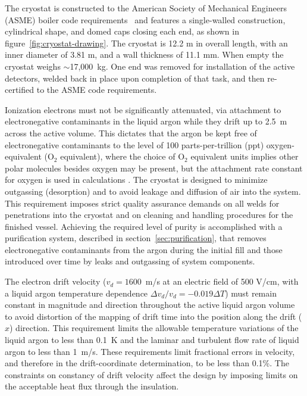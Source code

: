 The cryostat is constructed to the American Society of Mechanical Engineers (ASME) boiler code requirements~\cite{pressure:1316452} and features a single-walled construction, cylindrical shape, and domed caps closing each end, as shown in figure~\ref{fig:cryostat-drawing}. The cryostat is 12.2 m in overall length, with an inner diameter of 3.81 m, and a wall thickness of 11.1 mm.  When empty the cryostat weighs $\sim$17,000~kg.  One end was removed for installation of the active detectors, welded back in place upon completion of that task, and then re-certified to the ASME code requirements.  

Ionization electrons must not be significantly attenuated, via attachment to electronegative contaminants in the liquid argon while they drift up to 2.5~m across the active volume. This dictates that the argon be kept free of electronegative contaminants to the level of 100 parts-per-trillion (ppt) oxygen-equivalent (O$_2$ equivalent), where the choice of O$_2$ equivalent units implies other polar molecules besides oxygen may be present, but the attachment rate constant for oxygen is used in calculations . The cryostat is designed to minimize outgassing (desorption) and to avoid leakage and diffusion of air into the system. This requirement imposes strict quality assurance demands on all welds for penetrations into the cryostat and on cleaning and handling procedures for the finished vessel.  Achieving the required level of purity is accomplished with a purification system, described in section~\ref{sec:purification}, that removes electronegative contaminants from the argon during the initial fill and those introduced over time by leaks and outgassing of system components.

The electron drift velocity ($v_{d} = 1600$~m/s at an electric field of 500 V/cm, with a liquid argon temperature dependence $\Delta v_{d}/v_{d} = -0.019\Delta T$) must remain constant in magnitude and direction throughout the active liquid argon volume to avoid distortion of the mapping of drift time into the position along the drift ($\hat{x}$) direction. This requirement limits the allowable temperature variations of the liquid argon to less than 0.1~K and the laminar and turbulent flow rate of liquid argon to less than 1~m/s. These requirements limit fractional errors in velocity, and therefore in the drift-coordinate determination, to be less than 0.1\%. The constraints on constancy of drift velocity affect the design by imposing limits on the acceptable heat flux through the insulation.

